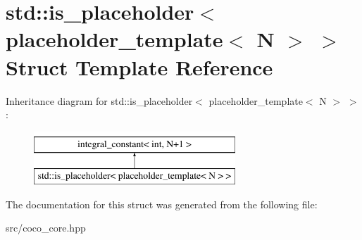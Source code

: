 \hypertarget{structstd_1_1is__placeholder_3_01placeholder__template_3_01_n_01_4_01_4}{}\section{std\+:\+:is\+\_\+placeholder$<$ placeholder\+\_\+template$<$ N $>$ $>$ Struct Template Reference}
\label{structstd_1_1is__placeholder_3_01placeholder__template_3_01_n_01_4_01_4}
Inheritance diagram for std\+:\+:is\+\_\+placeholder$<$ placeholder\+\_\+template$<$ N $>$ $>$\+:\begin{figure}[H]
\begin{center}
\leavevmode
\includegraphics[height=2.000000cm]{structstd_1_1is__placeholder_3_01placeholder__template_3_01_n_01_4_01_4}
\end{center}
\end{figure}


The documentation for this struct was generated from the following file\+:\begin{DoxyCompactItemize}
\item 
src/coco\+\_\+core.\+hpp\end{DoxyCompactItemize}
